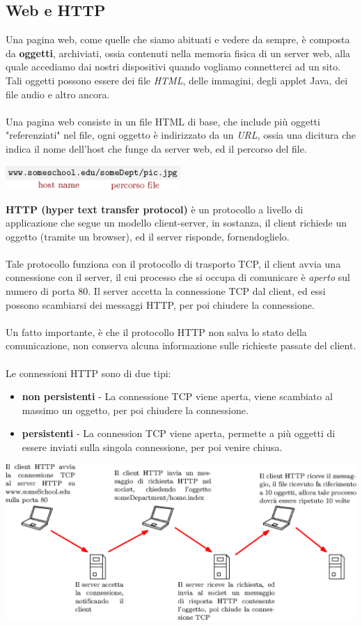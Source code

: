 \documentclass[12pt, letterpaper]{article}
\newcommand{\acc}{\\\hphantom{}\\}
\begin{document}
\subsection{Web e HTTP}
Una pagina web, come quelle che siamo abituati e vedere da sempre, è composta da \textbf{oggetti}, archiviati, 
ossia contenuti nella memoria fisica di un server web, alla quale accediamo dai nostri dispositivi quando vogliamo 
connetterci ad un sito. Tali oggetti possono essere dei file \textit{HTML}, delle immagini, degli 
applet Java, dei file audio e altro ancora.\acc 
Una pagina web consiste in un file HTML di base, che include più oggetti "referenziati" nel file, ogni oggetto 
è indirizzato da un \textit{URL}, ossia una dicitura che indica il nome dell'host che funge da 
server web, ed il percorso del file.\begin{center}
    \includegraphics[width=0.5\textwidth ]{images/url.eps}
\end{center}
\textbf{HTTP (hyper text transfer protocol)} è un protocollo a livello di applicazione che segue un 
modello client-server, in sostanza, il client richiede un oggetto (tramite un browser), ed il server
risponde, fornendoglielo.   \acc Tale protocollo funziona con il protocollo di trasporto TCP, il client avvia una 
connessione con il server, il cui processo che si occupa di comunicare è \textit{aperto} sul numero di 
porta 80. Il server accetta la connessione TCP dal client, ed essi possono scambiarsi dei messaggi 
HTTP, per poi chiudere la connessione.\acc 
Un fatto importante, è che il protocollo HTTP non salva lo stato della comunicazione, non conserva alcuna 
informazione sulle richieste passate del client.\acc 
Le connessioni HTTP sono di due tipi:\begin{itemize}
    \item \textbf{non persistenti} - La connessione TCP viene aperta, viene scambiato al massimo un oggetto, 
    per poi chiudere la connessione.
    \item \textbf{persistenti} - La connession TCP viene aperta, permette a più oggetti di essere inviati 
    sulla singola connessione, per poi venire chiusa.
\end{itemize}\begin{center}
    \includegraphics[width=1\textwidth ]{images/httpnonPersistente.eps}
\end{center}
\end{document}
